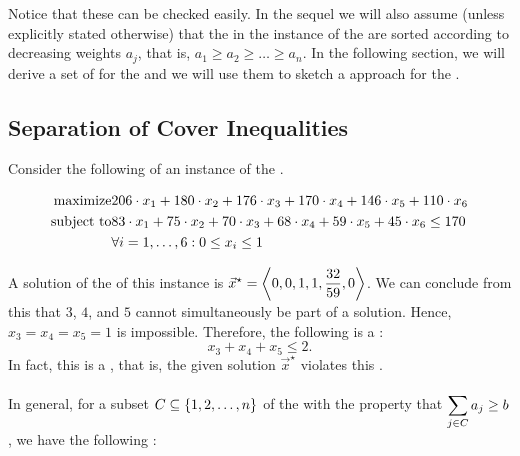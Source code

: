 \begin{note}
Notice that these  can be checked easily. In the sequel we will also assume (unless explicitly stated otherwise) that the  in the instance of the  are sorted according to decreasing weights $a_j$, that is, $a_1\geq a_2\geq\ldots\geq a_n$. In the following section, we will derive a set of  for the  and we will use them to sketch a  approach for the .
\end{note}

\subsection{Separation of Cover Inequalities}

\begin{example}
Consider the following  of an instance of the .

\begin{eqnarray}
\mbox{maximize}&206\cdot x_1+180\cdot x_2+176\cdot x_3+170\cdot x_4+146\cdot x_5+110\cdot x_6\\
\mbox{subject to}&83\cdot x_1+75\cdot x_2+70\cdot x_3+68\cdot x_4+59\cdot x_5+45\cdot x_6\leq 170\\
&\forall\rangei[i]{1}{6}:0\leq x_i\leq 1
\end{eqnarray}

A solution of the  of this instance is $\vec{x}^{\star}=\tupl{0,0,1,1,\dfrac{32}{59},0}$. We can conclude from this  that  $3$, $4$, and $5$ cannot simultaneously be part of a  solution. Hence, $x_3=x_4=x_5=1$ is impossible. Therefore, the following  is a :
\begin{equation}
x_3+x_4+x_5\leq2.
\end{equation}
In fact, this  is a , that is, the given solution $\vec{x}^{\star}$ violates this .
\end{example}

\paragraph{}
In general, for a subset $C\subseteq\accl{1,2,\ldots,n}$ of the  with the property that $\sumdomain[j]{C}{a_j}\geq b$, we have the following :

